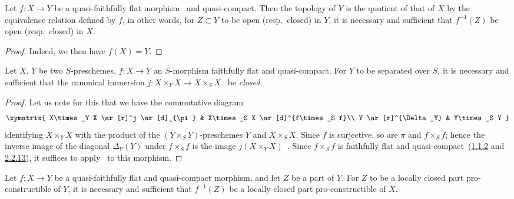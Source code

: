 \begin{corollary}[2.3.12]
\label{IV.2.3.12}
Let $f:X\to Y$ be a quasi-faithfully flat morphism~ and quasi-compact.
Then the topology of $Y$ is the quotient of that of $X$ by the equivalence relation defined by $f$, in other words, for $Z\subset Y$ to be open \textnormal{(}resp.\ closed\textnormal{)} in $Y$, it is necessary and sufficient that $f^{-1}(Z)$ be open \textnormal{(}resp.\ closed\textnormal{)} in $X$.
\end{corollary}

\begin{proof}
Indeed, we then have $f(X)=Y$.
\end{proof}

\begin{corollary}[2.3.13]
\label{IV.2.3.13}
Let $X$, $Y$ be two $S$-preschemes, $f:X\to Y$ an $S$-morphism faithfully flat and quasi-compact.
For $Y$ to be separated over $S$, it is necessary and sufficient that the canonical immersion $j:X\times_Y X\to X\times_S X$~ be \emph{closed}.
\end{corollary}

\begin{proof}
Let us note for this that we have the commutative diagram~
\[
\xymatrix{
  X\times_Y X \ar[r]^j \ar[d]_{\pi} & X\times_S X \ar[d]^{f\times_S f}\\
  Y \ar[r]^{\Delta_Y} & Y\times_S Y
}
\]
identifying $X\times_Y X$ with the product of the $(Y\times_S Y)$-preschemes $Y$ and $X\times_S X$.
Since $f$ is surjective, so are $\pi$ and $f\times_S f$; hence the inverse image of the diagonal $\Delta_Y(Y)$ under $f\times_S f$ is the image $j(X\times_Y X)$~.
Since $f\times_S f$ is faithfully flat and quasi-compact~({\hyperlink{ega4.c04.prop.1-1-2}{1.1.2}} and {\hyperlink{ega4.c04.cor.2-2-13}{2.2.13}}), it suffices to apply~ to this morphism.
\end{proof}

\begin{corollary}[2.3.14]
\label{IV.2.3.14}
Let $f:X\to Y$ be a quasi-faithfully flat and quasi-compact morphism, and let $Z$ be a part of $Y$.
For $Z$ to be a locally closed part pro-constructible of $Y$, it is necessary and sufficient that $f^{-1}(Z)$ be a locally closed part pro-constructible of $X$.
\end{corollary}

